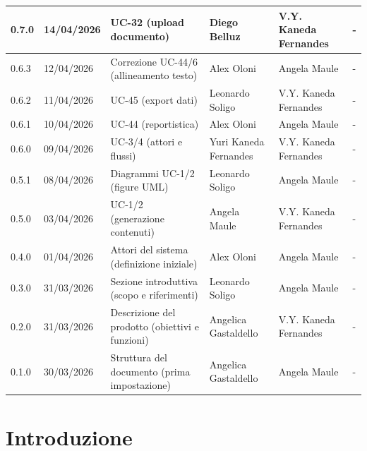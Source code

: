﻿\documentclass[a4paper,12pt]{article}
\begin{document}
{\begin{longtable}{|p{1.2cm}|p{1.9cm}|p{4.3cm}|p{2.8cm}|p{2.1cm}|p{2.1cm}|}
    \hline
    0.7.0 & 14/04/2026 & UC-32 (upload documento) & Diego Belluz & V.Y. Kaneda Fernandes & - \\
    \hline
    0.6.3 & 12/04/2026 & Correzione UC-44/6 (allineamento testo) & Alex Oloni & Angela Maule & - \\
    \hline
    \rowcolor{gray!8} 0.6.2 & 11/04/2026 & UC-45 (export dati) & Leonardo Soligo & V.Y. Kaneda Fernandes & - \\
    \hline
    0.6.1 & 10/04/2026 & UC-44 (reportistica) & Alex Oloni & Angela Maule & - \\
    \hline
    \rowcolor{gray!8} 0.6.0 & 09/04/2026 & UC-3/4 (attori e flussi) & Yuri Kaneda Fernandes & V.Y. Kaneda Fernandes & - \\
    \hline
    0.5.1 & 08/04/2026 & Diagrammi UC-1/2 (figure UML) & Leonardo Soligo & Angela Maule & - \\
    \hline
    \rowcolor{gray!8} 0.5.0 & 03/04/2026 & UC-1/2 (generazione contenuti) & Angela Maule & V.Y. Kaneda Fernandes & - \\
    \hline
    0.4.0 & 01/04/2026 & Attori del sistema (definizione iniziale) & Alex Oloni & Angela Maule & - \\
    \hline
    \rowcolor{gray!8} 0.3.0 & 31/03/2026 & Sezione introduttiva (scopo e riferimenti) & Leonardo Soligo & Angela Maule & - \\
    \hline
    0.2.0 & 31/03/2026 & Descrizione del prodotto (obiettivi e funzioni) & Angelica Gastaldello & V.Y. Kaneda Fernandes & - \\
    \hline
    \rowcolor{gray!8} 0.1.0 & 30/03/2026 & Struttura del documento (prima impostazione) & Angelica Gastaldello & Angela Maule & - \\
    \hline
\end{longtable}
}
\newpage
\tableofcontents

\listoffigures
\listoftables
{}
\setcounter{page}{5}
\section{Introduzione}
\end{document}

